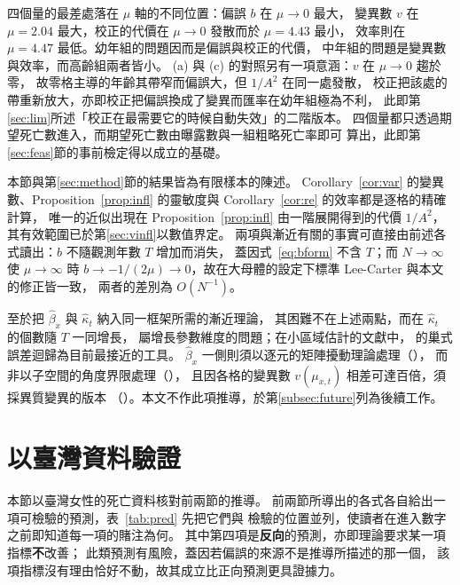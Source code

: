 \documentclass[UTF8, fontset=macnew, a4paper, 12pt]{ctexart}
\begin{document}
四個量的最差處落在 $\mu$ 軸的不同位置：偏誤 $b$ 在 $\mu\to0$ 最大，
變異數 $v$ 在 $\mu=2.04$ 最大，校正的代價在 $\mu\to0$ 發散而於 $\mu=4.43$ 最小，
效率則在 $\mu=4.47$ 最低。幼年組的問題因而是偏誤與校正的代價，
中年組的問題是變異數與效率，而高齡組兩者皆小。
(a) 與 (c) 的對照另有一項意涵：$v$ 在 $\mu\to0$ 趨於零，
故零格主導的年齡其帶窄而偏誤大，但 $1/A^2$ 在同一處發散，
校正把該處的帶重新放大，亦即校正把偏誤換成了變異而匯率在幼年組極為不利，
此即第\ref{sec:lim}所述「校正在最需要它的時候自動失效」的二階版本。
四個量都只透過期望死亡數進入，而期望死亡數由曝露數與一組粗略死亡率即可
算出，此即第\ref{sec:feas}節的事前檢定得以成立的基礎。


本節與第\ref{sec:method}節的結果皆為有限樣本的陳述。
Corollary~\ref{cor:var} 的變異數、Proposition~\ref{prop:infl} 的靈敏度與
Corollary~\ref{cor:re} 的效率都是逐格的精確計算，
唯一的近似出現在 Proposition~\ref{prop:infl} 由一階展開得到的代價 $1/A^2$，
其有效範圍已於第\ref{sec:vinfl}以數值界定。
兩項與漸近有關的事實可直接由前述各式讀出：$b$ 不隨觀測年數 $T$ 增加而消失，
蓋因式~\eqref{eq:bform} 不含 $T$；而 $N\to\infty$ 使 $\mu\to\infty$ 時
$b\to-1/(2\mu)\to0$，故在大母體的設定下標準 Lee-Carter 與本文的修正皆一致，
兩者的差別為 $O(N^{-1})$。

至於把 $\hat\beta_x$ 與 $\hat\kappa_t$ 納入同一框架所需的漸近理論，
其困難不在上述兩點，而在 $\hat\kappa_t$ 的個數隨 $T$ 一同增長，
屬增長參數維度的問題；在小區域估計的文獻中，
\citet{lahiri2023} 的巢式誤差迴歸為目前最接近的工具。
$\hat\beta_x$ 一側則須以逐元的矩陣擾動理論處理（\citealp{abbe2020}），
而非以子空間的角度界限處理（\citealp{caizhang2018}），
且因各格的變異數 $v(\mu_{x,t})$ 相差可達百倍，須採異質變異的版本
（\citealp{zhang2022}）。本文不作此項推導，於第\ref{subsec:future}列為後續工作。

\section{以臺灣資料驗證}\label{sec:valid}

本節以臺灣女性的死亡資料核對前兩節的推導。
前兩節所導出的各式各自給出一項可檢驗的預測，表~\ref{tab:pred} 先把它們與
檢驗的位置並列，使讀者在進入數字之前即知道每一項的賭注為何。
其中第四項是\textbf{反向}的預測，亦即理論要求某一項指標\textbf{不}改善；
此類預測有風險，蓋因若偏誤的來源不是推導所描述的那一個，
該項指標沒有理由恰好不動，故其成立比正向預測更具證據力。
\end{document}
